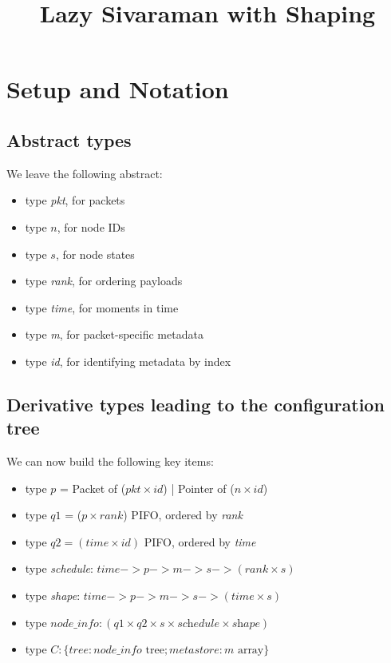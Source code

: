 \documentclass{article}
\begin{document}
\title{Lazy Sivaraman with Shaping}
\maketitle

\section{Setup and Notation}

\subsection{Abstract types}
We leave the following abstract:
\begin{itemize}
\item type \textit{pkt}, for packets 
\item type $n$, for node IDs 
\item type $s$, for node states
\item type \textit{rank}, for ordering payloads
\item type \textit{time}, for moments in time
\item type \textit{m}, for packet-specific metadata
\item type \textit{id}, for identifying metadata by index
\end{itemize}

\subsection{Derivative types leading to the configuration tree}

We can now build the following key items:
\begin{itemize}
\item type $p$ = Packet of ($\mathit{pkt} \times \mathit{id}$) | Pointer of ($n \times \mathit{id}$) 
\item type $q1$ = ($p \times \mathit{rank}$) PIFO, ordered by \textit{rank} 
\item type $q2 = (\mathit{time} \times \mathit{id})$ PIFO, ordered by \textit{time} 
\item type \textit{schedule}: $\mathit{time} -> p -> m -> s -> (\mathit{rank} \times s)$ 
\item type \textit{shape}: $\mathit{time} -> p -> m -> s -> (\mathit{time} \times s)$ 
\item type $\mathit{node\_info}:  (q1 \times q2 \times s \times \textit{schedule} \times \textit{shape})$
\item type $C: \{ \mathit{tree}: \mathit{node\_info} \text{ tree}; 
			\mathit{metastore}: m \text{ array} \}$ 
\end{itemize}
\end{document}
